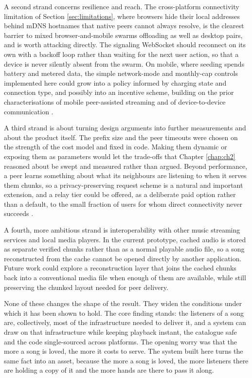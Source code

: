 \par A second strand concerns resilience and reach. The cross-platform connectivity limitation of Section \ref{sec:limitations}, where browsers hide their local addresses behind mDNS hostnames that native peers cannot always resolve, is the clearest barrier to mixed browser-and-mobile swarms offloading as well as desktop pairs, and is worth attacking directly. The signaling WebSocket should reconnect on its own with a backoff loop rather than waiting for the next user action, so that a device is never silently absent from the swarm. On mobile, where seeding spends battery and metered data, the simple network-mode and monthly-cap controls implemented here could grow into a policy informed by charging state and connection type, and possibly into an incentive scheme, building on the prior characterisations of mobile peer-assisted streaming and of device-to-device communication \cite{spotify_mobile_p2p,d2d_survey}.

\par A third strand is about turning design arguments into further measurements and about the product itself. The prefix size and the peer timeouts were chosen on the strength of the cost model and fixed in code. Making them dynamic or exposing them as parameters would let the trade-offs that Chapter \ref{chap:ch2} reasoned about be swept and measured rather than argued. Beyond performance, a peer learns something about what its neighbours are listening to when it serves them chunks, so a privacy-preserving request scheme is a natural and important extension, and a relay tier could be offered, as a deliberate paid option rather than a default, to the small fraction of users for whom direct connectivity never succeeds \cite{relays_turn}.

\par A fourth, more ambitious strand is interoperability with other music streaming services and local media players. In the current prototype, cached audio is stored as separate verified chunks rather than as a normal playable audio file, so a song reconstructed from the cache cannot be opened directly by another application. Future work could explore a reconstruction layer that joins the cached chunks back into a conventional media file when enough of them are available, while still preserving the chunked layout needed for peer delivery.

\par None of these changes the shape of the result. They widen the conditions under which it has been shown to hold. The core finding stands: the listeners of a song are, collectively, most of the infrastructure needed to deliver it, and a system can draw on that infrastructure while keeping playback instant, the catalogue safe and the code single-sourced across platforms. The opening worry was that the more a song is loved, the more it costs to serve. The system built here turns the same fact into an asset, because the more a song is loved, the more listeners there are holding a copy of it and the more hands are there to pass it along.
